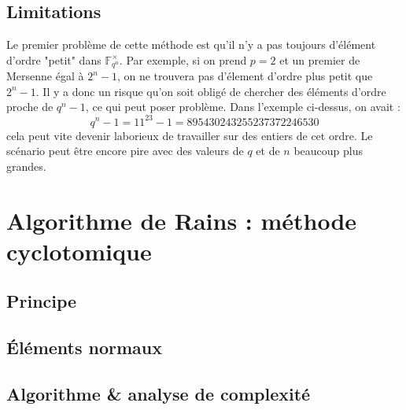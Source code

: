 \documentclass[a4paper]{article} %
\numberwithin{section}{part}
\numberwithin{equation}{section}
\newcommand\GF[1]{\mathbb{F}_{#1}}
\begin{document}
\subsection{Limitations}
Le premier problème de cette méthode est qu'il n'y a pas toujours d'élément
d'ordre "petit" dans $\GF{q^n}^{\times}$. Par exemple, si on prend $p = 2$ et un
premier de Mersenne égal à $2^n - 1$, on ne trouvera pas d'élement d'ordre plus
petit que $2^n - 1$. Il y a donc un risque qu'on soit obligé de chercher des
éléments d'ordre proche de $q^n - 1$, ce qui peut poser problème. Dans l'exemple
ci-dessus, on avait :
\[q^n - 1 = 11^{23} - 1 = 895430243255237372246530\]
cela peut vite devenir laborieux de travailler sur des entiers de cet ordre. Le
scénario peut être encore pire avec des valeurs de $q$ et de $n$ beaucoup plus
grandes.\par


\section{Algorithme de Rains : méthode cyclotomique}

\subsection{Principe}

\subsection{Éléments normaux}

\subsection{Algorithme \& analyse de complexité}
\end{document}
